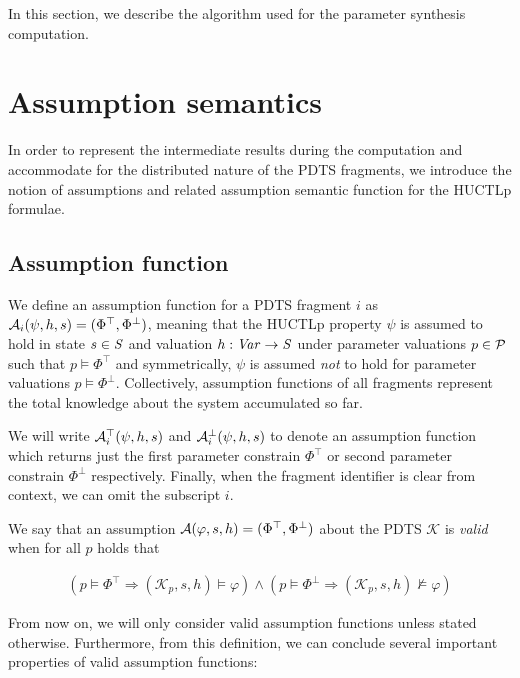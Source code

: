 In this section, we describe the algorithm used for the parameter synthesis computation.

\section{Assumption semantics}

In order to represent the intermediate results during the computation and accommodate for the distributed nature of the \ac{PDTS} fragments, we introduce the notion of assumptions and related assumption semantic function for the \ac{HUCTLp} formulae.

\subsection{Assumption function}

We define an assumption function for a \ac{PDTS} fragment $i$ as $\mathcal{A}_i(\psi, h, s) = (\Phi^\top, \Phi^\bot)$, meaning that the \ac{HUCTLp} property $\psi$ is assumed to hold in state $s \in \mathit{S}$ and valuation $h : \mathit{Var} \to \mathit{S}$ under parameter valuations $p \in \mathcal{P}$ such that $p \models \Phi^\top$ and symmetrically, $\psi$ is assumed \emph{not} to hold for parameter valuations $p \models \Phi^\bot$. Collectively, assumption functions of all fragments represent the total knowledge about the system accumulated so far.

We will write $\mathcal{A}^\top_i(\psi, h, s)$ and $\mathcal{A}^\bot_i(\psi, h, s)$ to denote an assumption function which returns just the first parameter constrain $\Phi^\top$ or second parameter constrain $\Phi^\bot$ respectively. Finally, when the fragment identifier is clear from context, we can omit the subscript $i$.

We say that an assumption $\mathcal{A}(\varphi, s, h) = (\Phi^\top, \Phi^\bot)$ about the \ac{PDTS} $\mathcal{K}$ is \emph{valid} when for all $p$ holds that

\begin{align*}
	(p \models \Phi^\top \Rightarrow (\mathcal{K}_p, s, h) \models \varphi) \land (p \models \Phi^\bot \Rightarrow (\mathcal{K}_p, s, h) \not\models \varphi) 
\end{align*}

From now on, we will only consider valid assumption functions unless stated otherwise. Furthermore, from this definition, we can conclude several important properties of valid assumption functions:

